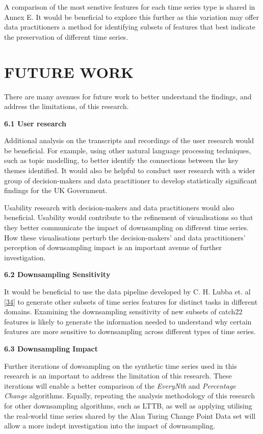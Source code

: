 \documentclass{article}
\begin{document}
A comparison of the most senstive features for each time series type is
shared in Annex E. It would be beneficial to explore this further as
this variation may offer data practitioners a method for identifying
subsets of features that best indicate the preservation of different
time series.

\hypertarget{future-work}{%
\section{FUTURE WORK}\label{future-work}}

There are many avenues for future work to better understand the
findings, and address the limitations, of this research.

\textbf{6.1 User research}

Additional analysis on the transcripts and recordings of the user
research would be beneficial. For example, using other natural language
processing techniques, such as topic modelling, to better identify the
connections between the key themes identified. It would also be helpful
to conduct user research with a wider group of decision-makers and data
practitioner to develop statistically significant findings for the UK
Government.

Usability research with decision-makers and data practitioners would
also beneficial. Usability would contribute to the refinement of
visualisations so that they better communicate the impact of
downsampling on different time series. How these visualisations perturb
the decision-makers' and data practitioners' perception of downsampling
impact is an important avenue of further investigation.

\textbf{6.2 Downsampling Sensitivity}

It would be beneficial to use the data pipeline developed by C. H. Lubba
et. al \protect\hyperlink{ref-catch22}{{[}34{]}} to generate other
subsets of time series features for distinct tasks in different domains.
Examining the downsampling sensitivity of new subsets of catch22
features is likely to generate the information needed to understand why
certain features are more sensitive to downsampling across different
types of time series.

\textbf{6.3 Downsampling Impact}

Further iterations of dowsampling on the synthetic time series used in
this research is an important to address the limitation of this
research. These iterations will enable a better comparison of the
\emph{EveryNth} and \emph{Percentage Change} algorithms. Equally,
repeating the analysis methodology of this research for other
downsampling algorithms, such as LTTB, as well as applying utilising the
real-world time series shared by the Alan Turing Change Point Data set
will allow a more indept investigation into the impact of downsampling.
\end{document}
